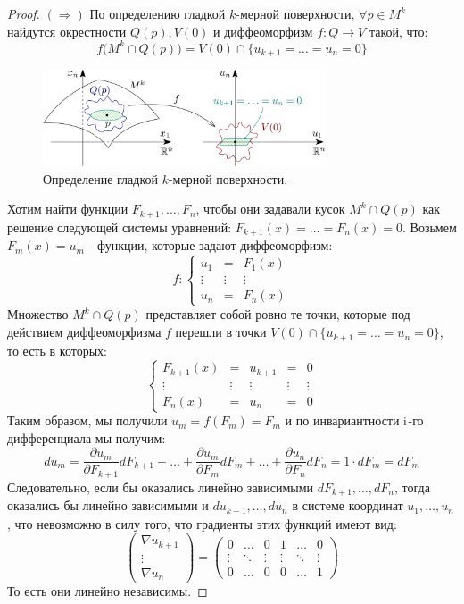\documentclass[12pt]{article}
\newcommand{\RN}[1]{%
	\textup{\uppercase\expandafter{\romannumeral#1}}%
}
\theoremstyle{definition}
\begin{document}
\begin{proof}
	$(\Rightarrow)$ По определению гладкой $k$-мерной поверхности, $\forall p \in M^k$ найдутся окрестности $Q(p), V(0)$ и диффеоморфизм $f \colon Q \to V$ такой, что:
	$$
		f\big(M^k \cap Q(p)\big) = V(0) \cap \{u_{k+1} = \dotsc = u_n = 0\}
	$$
	\begin{figure}[H]
		\centering
		\includegraphics[width=0.75\textwidth]{19_2.png}
		\caption{Определение гладкой $k$-мерной поверхности.}
		\label{19_4}
	\end{figure}
	Хотим найти функции $F_{k+1}, \dotsc, F_n$, чтобы они задавали кусок $M^k \cap Q(p)$ как решение следующей системы уравнений: $F_{k+1}(x) = \dotsc = F_n(x) = 0$. Возьмем $F_m(x) = u_m$ - функции, которые задают диффеоморфизм:
	$$
		f \colon \left\{
		\begin{array}{ccc}
			u_1& = &F_1(x) \\
			\vdots & \vdots & \vdots \\
			u_n& = &F_n(x)
		\end{array}\right.
	$$
	Множество $M^k \cap Q(p)$ представляет собой ровно те точки, которые под действием диффеоморфизма $f$ перешли в точки $V(0) \cap \{u_{k+1} = \dotsc = u_n = 0\}$, то есть в которых: 	
	$$
		\left\{
		\begin{array}{ccccc}
			F_{k+1}(x) & = & u_{k+1} &=& 0\\
			\vdots & \vdots & \vdots & \vdots & \vdots \\
			F_n(x)& = &u_n &=& 0
		\end{array}\right.
	$$
	Таким образом, мы получили $u_m = f(F_m) = F_m$ и по инвариантности $\RN{1}$-го дифференциала мы получим:
	$$
		du_m = \dfrac{\partial u_m}{\partial F_{k+1}}dF_{k+1} + \dotsc + \dfrac{\partial u_m}{\partial F_m}dF_m + \dotsc + \dfrac{\partial u_n}{\partial F_n}dF_n = 1{\cdot}dF_m = dF_m
	$$
	Следовательно, если бы оказались линейно зависимыми $dF_{k+1}, \dotsc, dF_n$, тогда оказались бы линейно зависимыми и $du_{k+1}, \dotsc, du_n$ в системе координат $u_1, \dotsc, u_n$, что невозможно в силу того, что градиенты этих функций имеют вид:
	$$
		\begin{pmatrix}
			\nabla u_{k+1} \\
			\vdots \\
			\nabla u_n
		\end{pmatrix} = 
		\begin{pmatrix}
			0 & \dotsc & 0 & 1 & \dotsc & 0 \\
			\vdots & \ddots & \vdots & \vdots & \ddots & \vdots \\
			0 & \dotsc & 0 & 0 & \dotsc & 1
		\end{pmatrix}
	$$
	То есть они линейно независимы.
\end{proof}
\end{document}
